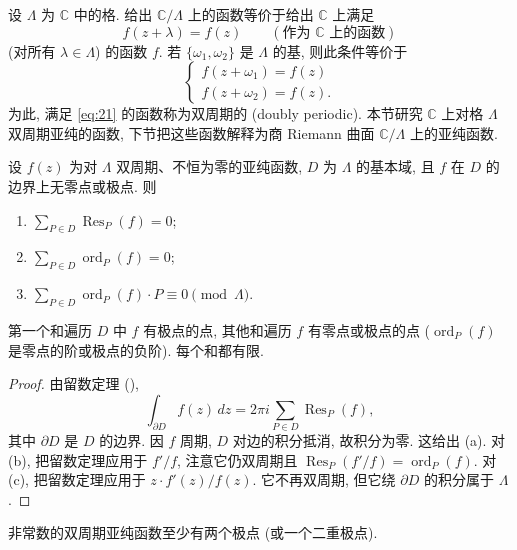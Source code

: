设 $\Lambda$ 为 $\mathbb{C}$ 中的格. 给出 $\mathbb{C}/\Lambda$ 上的函数等价于给出 $\mathbb{C}$ 上满足
\begin{equation} \label{eq:21}
f(z+\lambda) = f(z) \qquad (\text{作为 } \mathbb{C} \text{ 上的函数})
\tag{21}
\end{equation}
(对所有 $\lambda\in\Lambda$) 的函数 $f$. 若 $\{\omega_1, \omega_2\}$ 是 $\Lambda$ 的基, 则此条件等价于
\[
\begin{cases}
f(z+\omega_1) = f(z)\\
f(z+\omega_2) = f(z).
\end{cases}
\]
为此, 满足 \eqref{eq:21} 的函数称为双周期的 (doubly periodic). 本节研究 $\mathbb{C}$ 上对格 $\Lambda$ 双周期亚纯的函数, 下节把这些函数解释为商 Riemann 曲面 $\mathbb{C}/\Lambda$ 上的亚纯函数.

\begin{proposition} \label{thm:3.2.1} 
设 $f(z)$ 为对 $\Lambda$ 双周期、不恒为零的亚纯函数, $D$ 为 $\Lambda$ 的基本域, 且 $f$ 在 $D$ 的边界上无零点或极点. 则
\begin{enumerate}[label=\textup{(\alph*)}]
\item $\sum\limits_{P\in D}\operatorname{Res}_P(f) = 0$;
\item $\sum\limits_{P\in D}\operatorname{ord}_P(f) = 0$;
\item $\sum\limits_{P\in D}\operatorname{ord}_P(f)\cdot P\equiv 0 \pmod{\Lambda}$.
\end{enumerate}
第一个和遍历 $D$ 中 $f$ 有极点的点, 其他和遍历 $f$ 有零点或极点的点 ($\operatorname{ord}_P(f)$ 是零点的阶或极点的负阶). 每个和都有限.
\end{proposition}

\begin{proof}
由留数定理 (\cite[III, 5.2]{cartan1963}),
\[
\int_{\partial D} f(z)\,dz = 2\pi i\sum\limits_{P\in D}\operatorname{Res}_P(f),
\]
其中 $\partial D$ 是 $D$ 的边界. 因 $f$ 周期, $D$ 对边的积分抵消, 故积分为零. 这给出 (a). 对 (b), 把留数定理应用于 $f'/f$, 注意它仍双周期且 $\operatorname{Res}_P(f'/f) = \operatorname{ord}_P(f)$. 对 (c), 把留数定理应用于 $z\cdot f'(z)/f(z)$. 它不再双周期, 但它绕 $\partial D$ 的积分属于 $\Lambda$.
\end{proof}

\begin{corollary} \label{thm:3.2.2} 
非常数的双周期亚纯函数至少有两个极点 (或一个二重极点).
\end{corollary}

